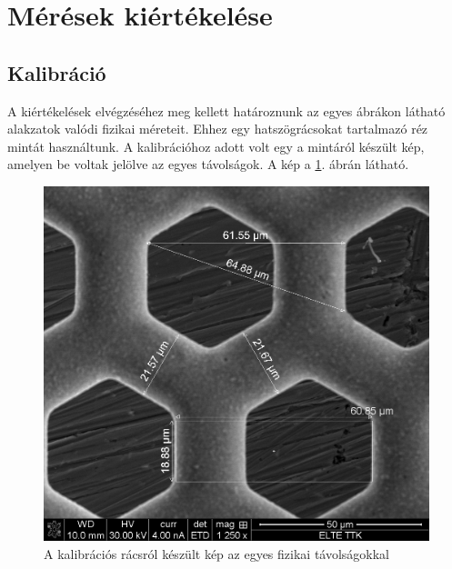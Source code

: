 \documentclass[12pt,a4paper]{article}
\begin{document}
\section{Mérések kiértékelése}
\subsection{Kalibráció}
\hspace*{10pt} A kiértékelések elvégzéséhez meg kellett határoznunk az egyes ábrákon látható alakzatok valódi fizikai méreteit. Ehhez egy hatszögrácsokat tartalmazó réz mintát használtunk. A kalibrációhoz adott volt egy a mintáról készült kép, amelyen be voltak jelölve az egyes távolságok. A kép a \ref{fig:kalib}. ábrán látható. 
\begin{figure}[!h]
\centering \includegraphics[width=0.8\linewidth]{E/kalib}
\caption{A kalibrációs rácsról  készült kép az egyes fizikai távolságokkal}
\label{fig:kalib}
\end{figure}
\end{document}
